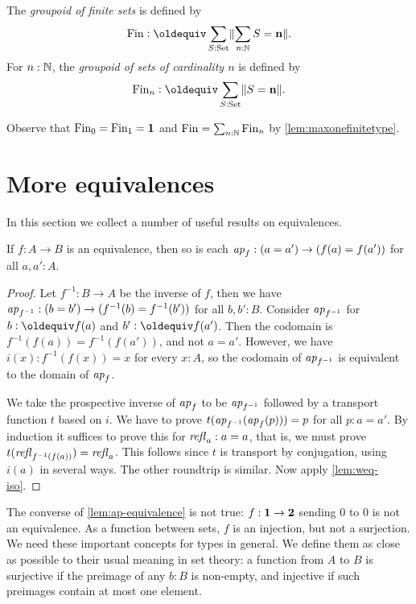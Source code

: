 \begin{definition}
\begin{definition}\label{def:groupoidFin}
The \emph{groupoid of finite sets} is defined by
\[
\fin\defeq\sum_{S:\Set}\Trunc{\sum_{n:\NN}S=\bn{n}}.
\]
For $n:\mathbb{N}$, the \emph{groupoid of sets of cardinality $n$} is defined by
\[
\fin_n\defequi \sum_{S:\Set}\Trunc{S=\bn{n}}.
\]
\end{definition}
Observe that $\operatorname{Fin}_0=\operatorname{Fin}_1=\mathbf{1} $ and $\operatorname{Fin}=\sum_{n:\mathbb{N}}\operatorname{Fin}_n$
by \cref{lem:maxonefinitetype}.

\section{More equivalences}
\label{sec:more-on-equivalences}

In this section we collect a number of useful results on equivalences.

\begin{lemma}\label{lem:ap-equivalence}
If $f:A\to B$ is an equivalence, then so is each 
$\mathop{{\it ap}_{f}}: (a=a') \to (f(a)=f(a'))$ for all $a,a':A$.
\end{lemma}
\begin{proof}
Let $f^{-1} : B\to A$ be the inverse of $f$, then we have 
$\mathop{{\it ap}_{f^{-1}}}: (b=b') \to (f^{-1}(b)=f^{-1}(b'))$ for all $b,b':B$.
Consider $\mathop{{\it ap}_{f^{-1}}}$ for $b\defeq f(a)$ and $b'\defeq f(a')$.
Then the codomain is $f^{-1}(f(a))=f^{-1}(f(a'))$, and not $a=a'$.
However, we have $i(x):f^{-1}(f(x))=x$ for every $x:A$, so the 
codomain of $\mathop{{\it ap}_{f^{-1}}}$ is equivalent to the domain of $\mathop{{\it ap}_{f}}$.

We take the prospective inverse of $\mathop{{\it ap}_{f}}$ to be $\mathop{{\it ap}_{f^{-1}}}$
followed by a transport function $t$ based on $i$. 
We have to prove $t(\mathop{{\it ap}_{f^{-1}}}(\mathop{{\it ap}_{f}}(p)))=p$ for all $p:a=a'$.
By induction it suffices to prove this for $\mathop{{\it refl}_{a}}:a=a$,
that is, we must prove $t(\mathop{{\it refl}_{f^{-1}(f(a))}})=\mathop{{\it refl}_{a}}$.
This follows since $t$ is transport by conjugation,
using $i(a)$ in several ways. The other roundtrip is similar.
Now apply \cref{lem:weq-iso}.
\end{proof}

The converse of \cref{lem:ap-equivalence} is not
true: $f:\mathbf{1}\to\mathbf{2}$ sending $0$ to $0$ is not an
equivalence. As a function between sets,
$f$ is an injection, but not a surjection.
We need these important concepts for types in general.
We define them as close as possible to their
usual meaning in set theory: a function from $A$ to $B$ is 
surjective if the preimage of any $b:B$ is non-empty,
and injective if such preimages contain at most one element.


\end{definition}
